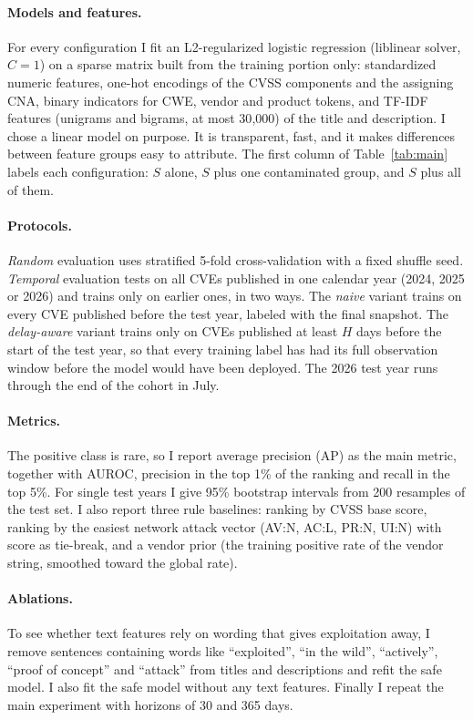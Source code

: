 \documentclass[11pt,a4paper]{article}
\begin{document}
\paragraph{Models and features.} For every configuration I fit an L2-regularized logistic regression (liblinear solver, $C=1$) on a sparse matrix built from the training portion only: standardized numeric features, one-hot encodings of the CVSS components and the assigning CNA, binary indicators for CWE, vendor and product tokens, and TF-IDF features (unigrams and bigrams, at most 30{,}000) of the title and description. I chose a linear model on purpose. It is transparent, fast, and it makes differences between feature groups easy to attribute. The first column of Table~\ref{tab:main} labels each configuration: $S$ alone, $S$ plus one contaminated group, and $S$ plus all of them.

\paragraph{Protocols.} \emph{Random} evaluation uses stratified 5-fold cross-validation with a fixed shuffle seed. \emph{Temporal} evaluation tests on all CVEs published in one calendar year (2024, 2025 or 2026) and trains only on earlier ones, in two ways. The \emph{naive} variant trains on every CVE published before the test year, labeled with the final snapshot. The \emph{delay-aware} variant trains only on CVEs published at least $H$ days before the start of the test year, so that every training label has had its full observation window before the model would have been deployed. The 2026 test year runs through the end of the cohort in July.

\paragraph{Metrics.} The positive class is rare, so I report average precision (AP) as the main metric, together with AUROC, precision in the top 1\% of the ranking and recall in the top 5\%. For single test years I give 95\% bootstrap intervals from 200 resamples of the test set. I also report three rule baselines: ranking by CVSS base score, ranking by the easiest network attack vector (AV:N, AC:L, PR:N, UI:N) with score as tie-break, and a vendor prior (the training positive rate of the vendor string, smoothed toward the global rate).

\paragraph{Ablations.} To see whether text features rely on wording that gives exploitation away, I remove sentences containing words like ``exploited'', ``in the wild'', ``actively'', ``proof of concept'' and ``attack'' from titles and descriptions and refit the safe model. I also fit the safe model without any text features. Finally I repeat the main experiment with horizons of 30 and 365 days.
\end{document}
